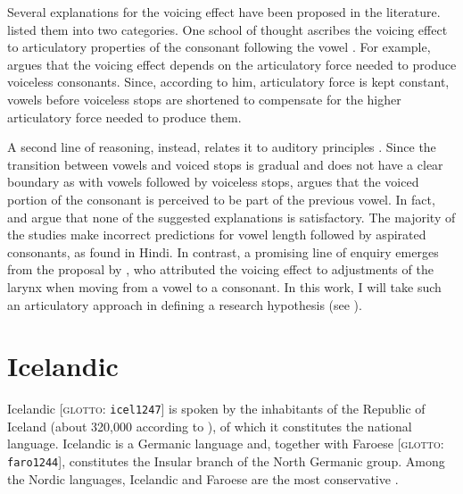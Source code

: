 \documentclass[11pt,a4paper,oneside,openany]{memoir}\usepackage[]{graphicx}\usepackage[]{color}
\begin{document}
Several explanations for the voicing effect have been proposed in the literature.
\citet{soskuthy2013} listed them into two categories.
One school of thought ascribes the voicing effect to articulatory properties of the consonant following the vowel \citep{belasco1953,chen1970}.
For example, \citet{belasco1953} argues that the voicing effect depends on the articulatory force needed to produce voiceless consonants.
Since, according to him, articulatory force is kept constant, vowels before voiceless stops are shortened to compensate for the higher articulatory force needed to produce them.

A second line of reasoning, instead, relates it to auditory principles \citep{javkin1976,kluender1988}.
Since the transition between vowels and voiced stops is gradual and does not have a clear boundary as with vowels followed by voiceless stops, \citet{javkin1976} argues that the voiced portion of the consonant is perceived to be part of the previous vowel.
In fact, \citet{maddieson1976} and \citet{durvasula2012} argue that none of the suggested explanations is satisfactory.
The majority of the studies make incorrect predictions for vowel length followed by aspirated consonants, as found in Hindi.
In contrast, a promising line of enquiry emerges from the proposal by \citet{chomsky1968}, who attributed the voicing effect to adjustments of the larynx when moving from a vowel to a consonant.
In this work, I will take such an articulatory approach in defining a research hypothesis (see ).

\section{Icelandic}
\label{s:icelandic}


Icelandic [\textsc{glotto}: \texttt{icel1247}] is spoken by the inhabitants of the Republic of Iceland (about 320,000 according to \citealt{arnason2011}), of which it constitutes the national language.
Icelandic is a Germanic language and, together with Faroese [\textsc{glotto}: \texttt{faro1244}], constitutes the Insular branch of the North Germanic group.
Among the Nordic languages, Icelandic and Faroese are the most conservative \citep{harbert2006,konig2013}.
\end{document}
